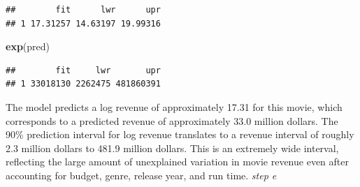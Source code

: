 \documentclass[
]{article}
\newenvironment{Shaded}{\begin{snugshade}}{\end{snugshade}}
\newcommand{\AttributeTok}[1]{\textcolor[rgb]{0.13,0.29,0.53}{#1}}
\newcommand{\DecValTok}[1]{\textcolor[rgb]{0.00,0.00,0.81}{#1}}
\newcommand{\FloatTok}[1]{\textcolor[rgb]{0.00,0.00,0.81}{#1}}
\newcommand{\FunctionTok}[1]{\textcolor[rgb]{0.13,0.29,0.53}{\textbf{#1}}}
\newcommand{\NormalTok}[1]{#1}
\newcommand{\OtherTok}[1]{\textcolor[rgb]{0.56,0.35,0.01}{#1}}
\newcommand{\SpecialCharTok}[1]{\textcolor[rgb]{0.81,0.36,0.00}{\textbf{#1}}}
\newcommand{\StringTok}[1]{\textcolor[rgb]{0.31,0.60,0.02}{#1}}
\begin{document}
\begin{Shaded}
\end{Shaded}

\begin{verbatim}
##        fit      lwr      upr
## 1 17.31257 14.63197 19.99316
\end{verbatim}

\begin{Shaded}
\begin{Highlighting}[]
\FunctionTok{exp}\NormalTok{(pred)}
\end{Highlighting}
\end{Shaded}

\begin{verbatim}
##        fit     lwr       upr
## 1 33018130 2262475 481860391
\end{verbatim}

The model predicts a log revenue of approximately 17.31 for this movie,
which corresponds to a predicted revenue of approximately 33.0 million
dollars. The 90\% prediction interval for log revenue translates to a
revenue interval of roughly 2.3 million dollars to 481.9 million
dollars. This is an extremely wide interval, reflecting the large amount
of unexplained variation in movie revenue even after accounting for
budget, genre, release year, and run time. \emph{step e}
\end{document}
